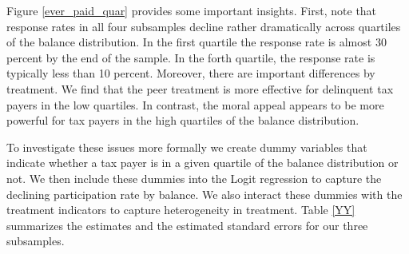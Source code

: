 \documentclass[12pt,titlepage]{article}
\begin{document}
Figure \ref{ever_paid_quar} provides some important insights. First,
note that response rates in all four subsamples decline rather
dramatically across quartiles of the balance distribution. In the
first quartile the response rate is almost 30 percent by the end of
the sample. In the forth quartile, the response rate is typically
less than 10 percent.  Moreover, there are important differences by
treatment.  We find that the peer treatment is more effective for
delinquent tax payers in the low quartiles. In contrast, the moral
appeal appears to be more powerful for tax payers in the high
quartiles of the balance distribution.

To investigate these issues more formally we create dummy variables
that indicate whether a tax payer is in a given quartile of the balance
distribution or not. We then include these dummies into the Logit
regression to capture the declining participation rate by balance. We
also interact these dummies with the treatment indicators to capture
heterogeneity in treatment. Table \ref{YY} summarizes the estimates
and the estimated standard errors for our three subsamples.
\end{document}
